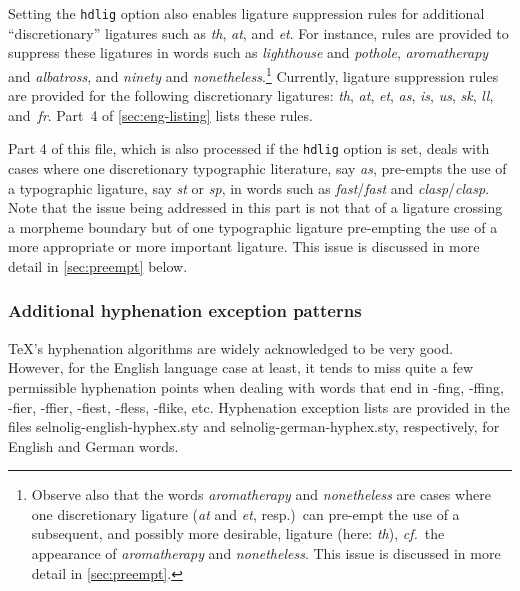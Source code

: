 \documentclass[12pt]{article}
\newcommand{\pkg}[1]{\textsf{#1}}
\newcommand{\opt}[1]{\texttt{#1}}
\begin{document}
Setting the \opt{hdlig} option also enables ligature suppression rules for additional \enquote{discretionary} ligatures such as \emph{th}, \emph{at}, and \emph{et}. For instance, rules are provided to suppress these ligatures in words such as \emph{ligh\mbox{th}ouse} and \emph{po\mbox{th}ole}, \emph{arom\mbox{at}herapy} and \emph{alb\mbox{at}ross}, and \emph{nin\mbox{et}y} and \emph{non\mbox{et}heless}.\footnote{Observe also that the words \emph{arom\mbox{at}herapy} and \emph{nonetheless} are cases where one discretionary ligature (\emph{at} and \emph{et}, resp.)\ can pre-empt the use of a subsequent, and possibly more desirable, ligature (here: \emph{th}), \emph{cf.}\ the appearance of \emph{aroma\breaklig therapy} and \emph{none\breaklig theless}. This issue is discussed in more detail in \cref{sec:preempt}.} Currently, ligature suppression rules are provided for the following discretionary ligatures: \emph{th}, \emph{at}, \emph{et}, \emph{as}, \emph{is}, \emph{us},  {\ebg \emph{sk}},  \emph{ll}, and~\emph{fr}. Part~4 of \cref{sec:eng-listing} lists these rules.

Part 4 of this file, which is also processed if the \opt{hdlig} option is set, deals with cases where one discretionary typographic literature, say \emph{as}, pre-empts the use of a typographic ligature, say \emph{st} or \emph{sp}, in words such as \emph{f\mbox{as}t}\slash \emph{fast} and \emph{cl\mbox{as}p}\slash \emph{clasp}. Note that the issue being addressed in this part is not that of a ligature crossing a morpheme boundary but of one typographic ligature pre-empting the use of a more appropriate or more important ligature. This issue is discussed in more detail in \cref{sec:preempt} below.



\subsubsection{Additional hyphenation exception patterns} \label{sec:addlhyph}

\TeX's hyphenation algorithms are widely acknowledged to be very good. However, for the English language case at least, it tends to miss quite a few permissible hyphenation points when dealing with words that end in -fing, -\mbox{ffi}ng, -fier, -\mbox{ffi}er, -fiest, -\mbox{fl}ess, -\mbox{fl}ike, etc. Hyphenation exception lists are provided in the files \pkg{selnolig-english-hyphex.sty} and \pkg{selnolig-german-hyphex.sty}, respectively, for English and German words.
\end{document}
